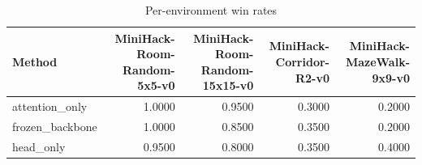 \begin{table}[htbp]
\centering
\caption{Per-environment win rates}
\label{tab:per-env}
\begin{tabular}{lrrrr}
\toprule
\textbf{Method} & \textbf{MiniHack-Room-Random-5x5-v0} & \textbf{MiniHack-Room-Random-15x15-v0} & \textbf{MiniHack-Corridor-R2-v0} & \textbf{MiniHack-MazeWalk-9x9-v0} \\
\midrule
attention\_only & 1.0000 & 0.9500 & 0.3000 & 0.2000 \\
frozen\_backbone & 1.0000 & 0.8500 & 0.3500 & 0.2000 \\
head\_only & 0.9500 & 0.8000 & 0.3500 & 0.4000 \\
\bottomrule
\end{tabular}
\end{table}